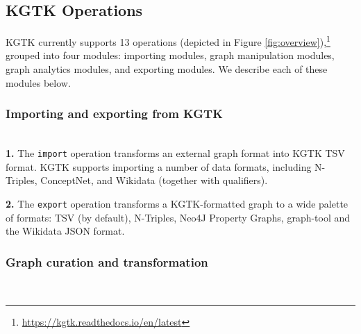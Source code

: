 \documentclass[runningheads]{llncs}
\begin{document}





\subsection{KGTK Operations}\label{sec:features}

KGTK currently supports 13 operations (depicted in Figure \ref{fig:overview}),\footnote{\url{https://kgtk.readthedocs.io/en/latest}} grouped into four modules: importing modules, graph manipulation modules, graph analytics modules, and exporting modules. We describe each of these modules below.

\subsubsection{Importing and exporting from KGTK}~\\



\textbf{1.}
The \texttt{import} operation transforms an external graph format into KGTK TSV format.
KGTK supports importing a number of data formats, including N-Triples, ConceptNet, and Wikidata (together with qualifiers). 

\textbf{2. } The \texttt{export} operation transforms a KGTK-formatted graph to a wide palette of formats: TSV (by default), N-Triples, Neo4J Property Graphs, graph-tool and the Wikidata JSON format.

\subsubsection{Graph curation and transformation}~\\
\end{document}
